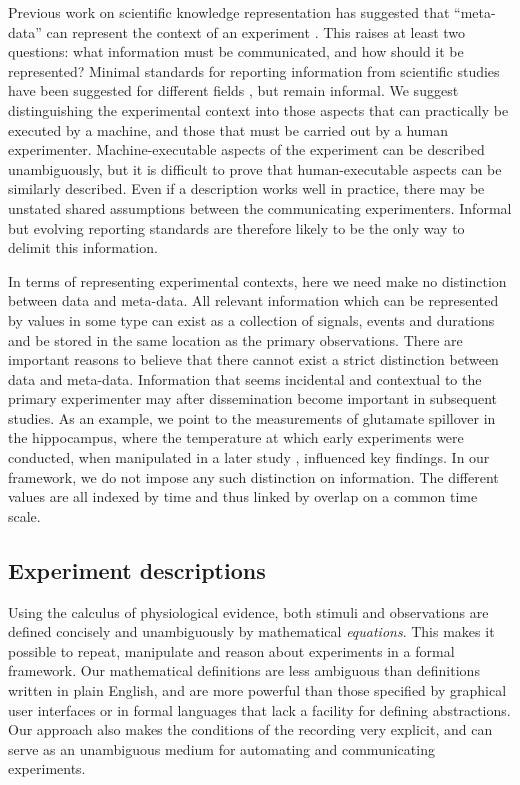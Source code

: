 \documentclass[11pt]{article}
\begin{document}
Previous work on scientific knowledge representation has suggested
that ``meta-data'' can represent the context of an experiment
\cite{Bower2009}. This raises at least two questions: what
information must be communicated, and how should it be represented?
Minimal standards for reporting information from scientific studies
have been suggested for different fields
\cite{Taylor2007,Gibson2008}, but remain informal. We suggest
distinguishing the experimental context into those aspects that can
practically be executed by a machine, and those that must be carried
out by a human experimenter. Machine-executable aspects of the
experiment can be described unambiguously, but it is difficult to prove
that human-executable aspects can be similarly described. Even if a
description works well in practice, there may be unstated shared assumptions
between the communicating experimenters. Informal but evolving reporting
standards are therefore likely to be the only way to delimit this information.

In terms of representing experimental contexts, here we need make no
distinction between data and meta-data. All relevant information which
can be represented by values in some type can exist as a collection of
signals, events and durations and be stored in the same location as
the primary observations. There are important reasons to believe that
there cannot exist a strict distinction between data and
meta-data. Information that seems incidental and contextual to the
primary experimenter may after dissemination become important in
subsequent studies. As an example, we point to the measurements of
glutamate spillover in the hippocampus, where the temperature at which
early experiments \cite{Kullmann1996} were conducted, when manipulated
in a later study \cite{Asztely1997}, influenced key
findings.  In our framework, we do not impose any such distinction on
information. The different values are all indexed by time and thus
linked by overlap on a common time scale.

\subsection*{Experiment descriptions}

Using the calculus of physiological evidence, both stimuli and
observations are defined concisely and unambiguously by mathematical
\emph{equations}. This makes it possible to repeat, manipulate and
reason about experiments in a formal framework. Our mathematical
definitions are less ambiguous than definitions written in plain
English, and are more powerful than those specified by graphical user
interfaces or in formal languages that lack a facility for defining
abstractions. Our approach also makes the conditions of the recording
very explicit, and can serve as an unambiguous medium for automating
and communicating experiments. 
\end{document}
